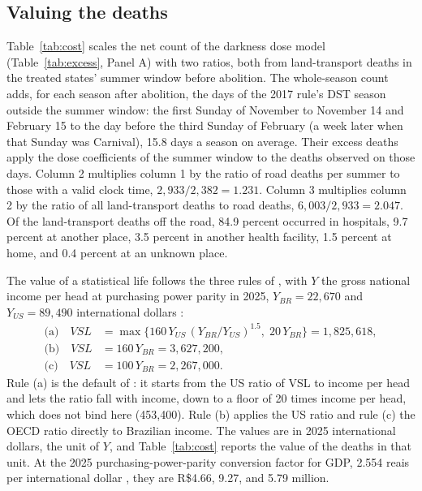 \subsection{Valuing the deaths}\label{app:cost}

Table~\ref{tab:cost} scales the net count of the darkness dose model (Table~\ref{tab:excess}, Panel A) with two ratios, both from land-transport deaths in the treated states' summer window before abolition. The whole-season count adds, for each season after abolition, the days of the 2017 rule's DST season outside the summer window: the first Sunday of November to November 14 and February 15 to the day before the third Sunday of February (a week later when that Sunday was Carnival), 15.8 days a season on average. Their excess deaths apply the dose coefficients of the summer window to the deaths observed on those days. Column 2 multiplies column 1 by the ratio of road deaths per summer to those with a valid clock time, $2{,}933/2{,}382 = 1.231$. Column 3 multiplies column 2 by the ratio of all land-transport deaths to road deaths, $6{,}003/2{,}933 = 2.047$. Of the land-transport deaths off the road, 84.9 percent occurred in hospitals, 9.7 percent at another place, 3.5 percent in another health facility, 1.5 percent at home, and 0.4 percent at an unknown place. %

The value of a statistical life follows the three rules of \citet{robinson2019valuing}, with $Y$ the gross national income per head at purchasing power parity in 2025, $Y_{\mathit{BR}} = 22{,}670$ and $Y_{\mathit{US}} = 89{,}490$ international dollars \citep{worldbank2026wdi}:
\begin{align*}
  \text{(a)}\quad \mathit{VSL} &= \max\{160\, Y_{\mathit{US}}\, (Y_{\mathit{BR}}/Y_{\mathit{US}})^{1.5},\; 20\, Y_{\mathit{BR}}\} = 1{,}825{,}618, \\
  \text{(b)}\quad \mathit{VSL} &= 160\, Y_{\mathit{BR}} = 3{,}627{,}200, \\
  \text{(c)}\quad \mathit{VSL} &= 100\, Y_{\mathit{BR}} = 2{,}267{,}000.
\end{align*}
Rule (a) is the default of \citet{robinson2019valuing}: it starts from the US ratio of VSL to income per head and lets the ratio fall with income, down to a floor of 20 times income per head, which does not bind here (453,400). Rule (b) applies the US ratio and rule (c) the OECD ratio directly to Brazilian income. The values are in 2025 international dollars, the unit of $Y$, and Table~\ref{tab:cost} reports the value of the deaths in that unit. At the 2025 purchasing-power-parity conversion factor for GDP, 2.554 reais per international dollar \citep{worldbank2026wdi}, they are R\$4.66, 9.27, and 5.79 million.


